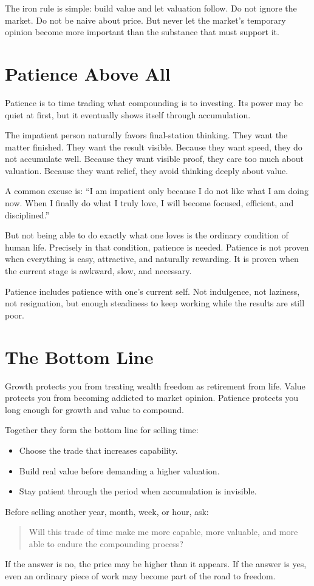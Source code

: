 The iron rule is simple: build value and let valuation follow. Do not ignore the market. Do not be naive about price. But never let the market's temporary opinion become more important than the substance that must support it.

\section*{Patience Above All}

Patience is to time trading what compounding is to investing. Its power may be quiet at first, but it eventually shows itself through accumulation.

The impatient person naturally favors final-station thinking. They want the matter finished. They want the result visible. Because they want speed, they do not accumulate well. Because they want visible proof, they care too much about valuation. Because they want relief, they avoid thinking deeply about value.

A common excuse is: ``I am impatient only because I do not like what I am doing now. When I finally do what I truly love, I will become focused, efficient, and disciplined.''

But not being able to do exactly what one loves is the ordinary condition of human life. Precisely in that condition, patience is needed. Patience is not proven when everything is easy, attractive, and naturally rewarding. It is proven when the current stage is awkward, slow, and necessary.

Patience includes patience with one's current self. Not indulgence, not laziness, not resignation, but enough steadiness to keep working while the results are still poor.

\section*{The Bottom Line}

Growth protects you from treating wealth freedom as retirement from life. Value protects you from becoming addicted to market opinion. Patience protects you long enough for growth and value to compound.

Together they form the bottom line for selling time:

\begin{itemize}
\item Choose the trade that increases capability.
\item Build real value before demanding a higher valuation.
\item Stay patient through the period when accumulation is invisible.
\end{itemize}

Before selling another year, month, week, or hour, ask:

\begin{quote}
Will this trade of time make me more capable, more valuable, and more able to endure the compounding process?
\end{quote}

If the answer is no, the price may be higher than it appears. If the answer is yes, even an ordinary piece of work may become part of the road to freedom.
